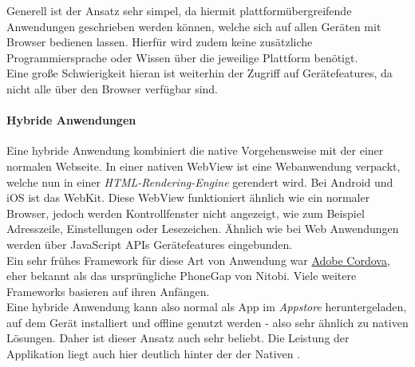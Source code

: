 \noindent
Generell ist der Ansatz sehr simpel, da hiermit plattformübergreifende Anwendungen geschrieben werden können, welche sich auf allen Geräten mit Browser bedienen lassen.
Hierfür wird zudem keine zusätzliche Programmiersprache oder Wissen über die jeweilige Plattform benötigt.\\
Eine große Schwierigkeit hieran ist weiterhin der Zugriff auf Gerätefeatures, da nicht alle über den Browser verfügbar sind.

\paragraph{Hybride Anwendungen}
\label{hybride_anwendung}
Eine hybride Anwendung kombiniert die native Vorgehensweise mit der einer normalen Webseite. 
In einer nativen WebView ist eine Webanwendung verpackt, welche nun in einer \textit{HTML-Rendering-Engine} gerendert wird. Bei Android und iOS ist das WebKit.
Diese WebView funktioniert ähnlich wie ein normaler Browser, jedoch werden Kontrollfenster nicht angezeigt, wie zum Beispiel Adresszeile, Einstellungen oder Lesezeichen.
Ähnlich wie bei Web Anwendungen werden über JavaScript APIs Gerätefeatures eingebunden.\\
Ein sehr frühes Framework für diese Art von Anwendung war \href{https://cordova.apache.org/}{Adobe Cordova}, eher bekannt als das ursprüngliche PhoneGap von Nitobi. Viele weitere Frameworks basieren auf ihren Anfängen.\\

\noindent
Eine hybride Anwendung kann also normal als App im \textit{Appstore} heruntergeladen, auf dem Gerät installiert und offline genutzt werden - also sehr ähnlich zu nativen Lösungen. Daher ist dieser Ansatz auch sehr beliebt.
Die Leistung der Applikation liegt auch hier deutlich hinter der der Nativen \cite{lachgar2017} \cite{bjorn-hansen2020}.

